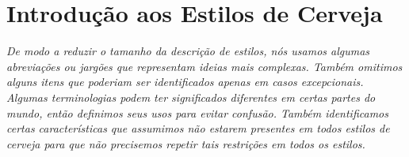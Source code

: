 \section*{Introdução aos Estilos de Cerveja}
\textit{De modo a reduzir o tamanho da descrição de estilos, nós usamos algumas abreviações ou jargões que representam ideias mais complexas. Também omitimos alguns itens que poderiam ser identificados apenas em casos excepcionais. Algumas terminologias podem ter significados diferentes em certas partes do mundo, então definimos seus usos para evitar confusão. Também identificamos certas características que assumimos não estarem presentes em todos estilos de cerveja para que não precisemos repetir tais restrições em todos os estilos.} \\
